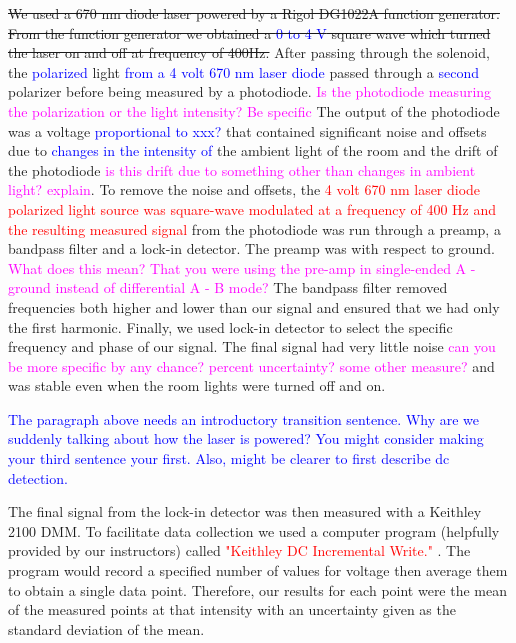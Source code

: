 \documentclass[prb,preprint]{revtex4-1}
\begin{document}
\sout{We used a 670 nm diode laser powered by a Rigol DG1022A function generator. From the function generator we obtained a \textcolor{blue}{0 to 4 V} square wave which turned the laser on and off at frequency of 400Hz. } After passing through the solenoid, the \textcolor{blue}{polarized} light \textcolor{blue}{from a 4 volt 670 nm laser diode } passed through a \textcolor{blue}{second} polarizer before being measured by a photodiode. \textcolor{magenta}{Is the photodiode measuring the polarization or the light intensity? Be specific} The output of the photodiode was a voltage \textcolor{blue}{proportional to xxx?}  that contained significant noise and offsets due to \textcolor{blue}{changes in the intensity of} the ambient light of the room and the drift of the photodiode \textcolor{magenta}{is this drift due to something other than changes in ambient light? explain}.  To remove the noise and offsets, the \textcolor{red}{4 volt 670 nm laser diode polarized light source was square-wave modulated at a frequency of 400 Hz and the resulting measured signal} from the photodiode was run through a preamp, a bandpass filter and a lock-in detector. The preamp  was with respect to ground. \textcolor{magenta}{What does this mean? That you were using the pre-amp in single-ended A - ground instead of differential A - B mode?} The bandpass filter removed frequencies both higher and lower than our signal and ensured that we had only the first harmonic. Finally, we used lock-in detector to select the specific frequency and phase of our signal. The final signal had very little noise \textcolor{magenta}{can you be more specific by any chance? percent uncertainty? some other measure? } and was stable even when the room lights were turned off and on. 


\textcolor{blue}{The paragraph above needs an introductory transition sentence. Why are we suddenly talking about how the laser is powered? You might consider making your third sentence your first. Also, might be clearer to first describe dc detection. }

The final signal from the lock-in detector was then measured with a Keithley 2100 DMM. To facilitate data collection we used a computer program (helpfully provided by our instructors) called \textcolor{red}{"Keithley DC Incremental Write." }.  The program would record a specified number of values for voltage then average them to obtain a single data point. Therefore, our results for each point were the mean of the measured points at that intensity with an uncertainty given as the standard deviation of the mean. 
\end{document}

